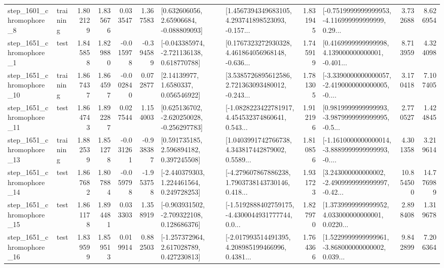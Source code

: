 \begin{tabular}{llrrrrllrlrr}
  step\_1601\_chromophore\_8 &  training &      1.802129 &    1.835676 &      0.033547 &  1.367583 &     [0.632606056, 2.65906684, -0.088809093] &  [1.4567394349683105, 4.293741898523093, -0.157... &       1.831945 &  [-0.7519999999999953, -4.116999999999999, 0.29... &            3.732688 &          8.626954 \\
  step\_1651\_chromophore\_1 &      test &      1.845858 &    1.829880 &     -0.015978 & -0.394589 &   [-0.043385974, -2.721136138, 0.618770788] &  [0.1767323272930328, 4.461864056968148, -0.636... &       1.745919 &  [0.4169999999999998, 4.139000000000001, -0.401... &            8.713959 &          4.324098 \\
 step\_1651\_chromophore\_10 &  training &      1.867437 &    1.864597 &     -0.002840 &  0.072877 &        [2.14139977, 1.6580337, 0.056546922] &  [3.5385726895612586, 2.721363093480012, -0.243... &       1.781305 &  [-3.3390000000000057, -2.4190000000000005, -0.... &            3.170418 &          7.107405 \\
 step\_1651\_chromophore\_11 &      test &      1.864743 &    1.892287 &      0.027544 &  1.154003 &   [0.625136702, -2.620250028, -0.256297783] &  [-1.0828223422781917, 4.454532374860641, 0.543... &       1.912196 &  [0.9819999999999993, -3.9879999999999995, -0.5... &            2.770527 &          1.424845 \\
 step\_1651\_chromophore\_13 &  training &      1.882539 &    1.851278 &     -0.031261 & -0.938387 &     [0.591735185, 2.596894182, 0.397245508] &  [1.0403991742766738, 4.343817442879002, 0.5589... &       1.810856 &  [-1.1610000000000014, -3.8889999999999993, -0.... &            4.301358 &          3.219614 \\
 step\_1651\_chromophore\_14 &      test &      1.867682 &    1.807884 &     -0.059798 & -1.953758 &    [-2.440379303, 1.224461564, 0.249728253] &  [-4.279607867886238, 1.7903738143730146, 0.418... &       1.931723 &  [3.243000000000002, -2.4909999999999997, -0.42... &           10.854500 &         14.776989 \\
 step\_1651\_chromophore\_15 &      test &      1.861178 &    1.894481 &      0.033303 &  1.358919 &   [-0.903931502, -2.709322108, 0.128686376] &  [-1.5192888402759175, -4.4300044931777744, 0.0... &       1.827970 &  [1.3739999999999952, 4.033000000000001, 0.0220... &            2.898408 &          1.319678 \\
 step\_1651\_chromophore\_16 &      test &      1.839599 &    1.859513 &      0.019914 &  0.882503 &    [-1.257372964, 2.617028789, 0.427230813] &  [-2.017993514491395, 4.208985199466996, 0.4381... &       1.764366 &  [1.5229999999999961, -3.868000000000002, 0.039... &            9.842899 &          7.206364 \\

\end{tabular}
